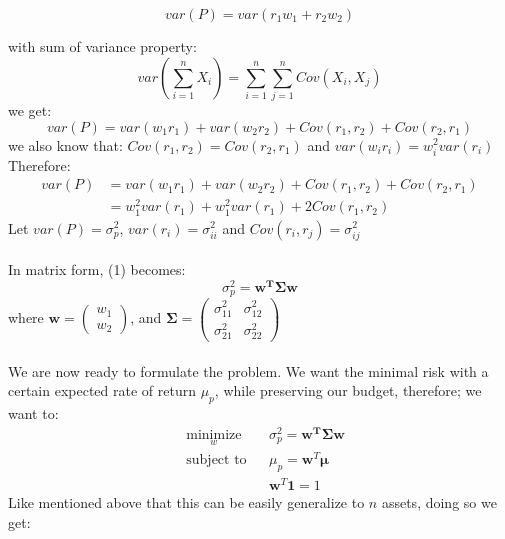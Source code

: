 \documentclass[12pt,titlepage,a4paper]{article}
\begin{document}
$$
var(P) = var(r_1w_1 + r_2w_2)
$$

with sum of variance property: $$var(\sum_{i=1}^{n}{X_i}) = \sum_{i=1}^n\sum_{j=1}^{n}{Cov(X_i,X_j)}$$
we get: 
$$
var(P) = var(w_1r_1)+var(w_2r_2)+Cov(r_1,r_2)+Cov(r_2,r_1)
$$
we also know that: $Cov(r_1,r_2) = Cov(r_2,r_1)$ and $var(w_ir_i)=w_i^2var(r_i)$ \\
Therefore: 
\begin{equation}
\begin{split}
var(P) &= var(w_1r_1)+var(w_2r_2)+Cov(r_1,r_2)+Cov(r_2,r_1)\\
&= w_1^2var(r_1) + w_1^2var(r_1) + 2Cov(r_1,r_2)
\end{split}
\end{equation}
Let $var(P)=\sigma_p^2$, $var(r_i)=\sigma_{ii}^2$ and $Cov(r_i,r_j)=\sigma_{ij}^2$ \\ \\
In matrix form, (1) becomes: 
\begin{equation*}
\sigma_p^2 = \mathbf{w^T\Sigma w}
\end{equation*}
where $\mathbf{w} = \begin{pmatrix} w_1 \\ w_2 \end{pmatrix}$, and $\mathbf{\Sigma} = \begin{pmatrix}\sigma_{11}^2 & \sigma_{12}^2 \\ \sigma_{21}^2 & \sigma_{22}^2 \end{pmatrix}$ \\ \\ 
We are now ready to formulate the problem. We want the minimal risk with a certain expected rate of return $\mu_p$, while preserving our budget, therefore; we want to: 
\begin{equation}
\begin{aligned}
& \underset{w}{\text{minimize}}
& &\sigma_p^2 = \mathbf{w^T\Sigma w}\\
& \text{subject to}
& & \mu_p = \mathbf{w}^T\mathbf{\mu} \\
&&& \mathbf{w}^T\mathbf{1}=1
\end{aligned}
\end{equation}
Like mentioned above that this can be easily generalize to $n$ assets, doing so we get: 
\end{document}
